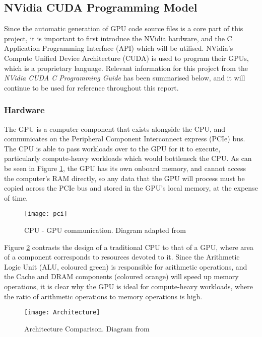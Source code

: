 \subsection{NVidia CUDA Programming Model}
Since the automatic generation of GPU code source files is a core part of this project, it is important to first introduce the NVidia hardware, and the C Application Programming Interface (API) which will be utilised. NVidia's Compute Unified Device Architecture (CUDA) is used to program their GPUs, which is a proprietary language. Relevant information for this project from the \textit{NVidia CUDA C Programming Guide} \cite{guide} has been summarised below, and it will continue to be used for reference throughout this report.

\subsubsection{Hardware}
The GPU is a computer component that exists alongside the CPU, and communicates on the Peripheral Component Interconnect express (PCIe) bus. The CPU is able to pass workloads over to the GPU for it to execute, particularly compute-heavy workloads which would bottleneck the CPU. As can be seen in Figure \ref{fig:pci}, the GPU has its own onboard memory, and cannot access the computer's RAM directly, so any data that the GPU will process must be copied across the PCIe bus and stored in the GPU's local memory, at the expense of time.

\begin{figure}[h!]
  \centering
  \texttt{[image: pci]}
  \caption{\label{fig:pci} CPU - GPU communication. Diagram adapted from \cite{nvlink}}
\end{figure}

\clearpage
\noindent Figure \ref{fig:arch} contrasts the design of a traditional CPU to that of a GPU, where area of a component corresponds to resources devoted to it. Since the Arithmetic Logic Unit (ALU, coloured green) is responsible for arithmetic operations, and the Cache and DRAM components (coloured orange) will speed up memory operations, it is clear why the GPU is ideal for compute-heavy workloads, where the ratio of arithmetic operations to memory operations is high.

\begin{figure}[h]
  \centering
  \texttt{[image: Architecture]}
  \caption{\label{fig:arch} Architecture Comparison. Diagram from \cite[p3]{guide}}
\end{figure}

